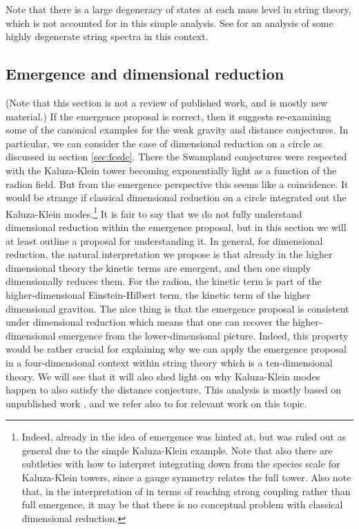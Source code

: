 \documentclass[11pt,a4paper]{article}
\numberwithin{equation}{section}
\numberwithin{table}{section}\setlength{\multlinegap}{25pt}
\begin{document}
{Note that there is a large degeneracy of states at each mass level in string theory, which is not accounted for in this simple analysis. See \cite{Heidenreich:2017sim} for an analysis of some highly degenerate string spectra in this context.

\subsection{Emergence and dimensional reduction}

(Note that this section is not a review of published work, and is mostly new material.) If the emergence proposal is correct, then it suggests re-examining some of the canonical examples for the weak gravity and distance conjectures. In particular, we can consider the case of dimensional reduction on a circle as discussed in section \ref{sec:fcsdc}. There the Swampland conjectures were respected with the Kaluza-Klein tower becoming exponentially light as a function of the radion field. But from the emergence perspective this seems like a coincidence. It would be strange if classical dimensional reduction on a circle integrated out the Kaluza-Klein modes.\footnote{Indeed, already in \cite{Ooguri:2006in} the idea of emergence was hinted at, but was ruled out as general due to the simple Kaluza-Klein example. Note that also there are subtleties with how to interpret integrating down from the species scale for Kaluza-Klein towers, since a gauge symmetry relates the full tower. Also note that, in the interpretation of \cite{Heidenreich:2017sim,Heidenreich:2018kpg} in terms of reaching strong coupling rather than full emergence, it may be that there is no conceptual problem with classical dimensional reduction.} It is fair to say that we do not fully understand dimensional reduction within the emergence proposal, but in this section we will at least outline a proposal for understanding it. In general, for dimensional reduction, the natural interpretation we propose is that already in the higher dimensional theory the kinetic terms are emergent, and then one simply dimensionally reduces them. For the radion, the kinetic term is part of the higher-dimensional Einstein-Hilbert term, the kinetic term of the higher dimensional graviton. The nice thing is that the emergence proposal is consistent under dimensional reduction which means that one can recover the higher-dimensional emergence from the lower-dimensional picture. Indeed, this property would be rather crucial for explaining why we can apply the emergence proposal in a four-dimensional context within string theory which is a ten-dimensional theory. We will see that it will also shed light on why Kaluza-Klein modes happen to also satisfy the distance conjecture. This analysis is mostly based on unpublished work \cite{erandaniel}, and we refer also to \cite{Corvilain:2018lgw,Bonetti:2013cza,Grimm:2018weo} for relevant work on this topic. 

}
\end{document}
